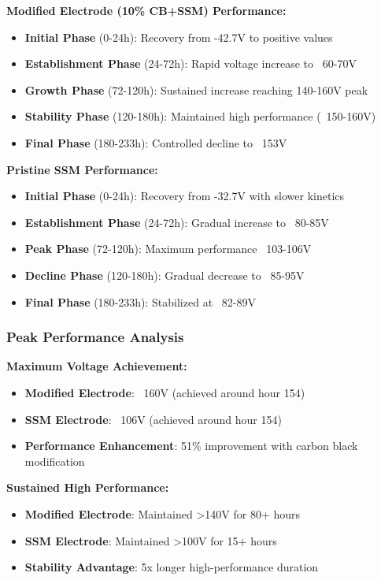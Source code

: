 \documentclass[12pt,a4paper]{article}
\begin{document}
\textbf{Modified Electrode (10\% CB+SSM) Performance:}
\begin{itemize}
    \item \textbf{Initial Phase} (0-24h): Recovery from -42.7V to positive values
    \item \textbf{Establishment Phase} (24-72h): Rapid voltage increase to ~60-70V
    \item \textbf{Growth Phase} (72-120h): Sustained increase reaching 140-160V peak
    \item \textbf{Stability Phase} (120-180h): Maintained high performance (~150-160V)
    \item \textbf{Final Phase} (180-233h): Controlled decline to ~153V
\end{itemize}

\textbf{Pristine SSM Performance:}
\begin{itemize}
    \item \textbf{Initial Phase} (0-24h): Recovery from -32.7V with slower kinetics
    \item \textbf{Establishment Phase} (24-72h): Gradual increase to ~80-85V
    \item \textbf{Peak Phase} (72-120h): Maximum performance ~103-106V
    \item \textbf{Decline Phase} (120-180h): Gradual decrease to ~85-95V
    \item \textbf{Final Phase} (180-233h): Stabilized at ~82-89V
\end{itemize}

\subsubsection{Peak Performance Analysis}

\textbf{Maximum Voltage Achievement:}
\begin{itemize}
    \item \textbf{Modified Electrode}: ~160V (achieved around hour 154)
    \item \textbf{SSM Electrode}: ~106V (achieved around hour 154)
    \item \textbf{Performance Enhancement}: 51\% improvement with carbon black modification
\end{itemize}

\textbf{Sustained High Performance:}
\begin{itemize}
    \item \textbf{Modified Electrode}: Maintained >140V for 80+ hours
    \item \textbf{SSM Electrode}: Maintained >100V for 15+ hours
    \item \textbf{Stability Advantage}: 5x longer high-performance duration
\end{itemize}
\end{document}
